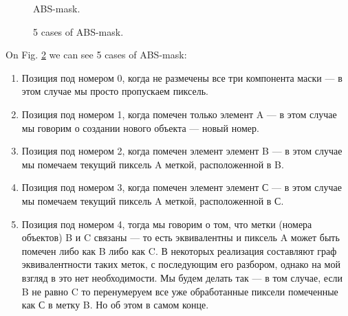 \documentclass[12pt,a4paper,oneside,titlepage]{article}
\begin{document}
\begin{figure}[h]
  \caption{ABS-mask.}
  \label{fig:abc_mask}
\end{figure}



\begin{figure}[h]
  \caption{5 cases of ABS-mask.}
  \label{fig:abc_all_cases}
\end{figure}


On Fig. \ref{fig:abc_all_cases} we can see 5 cases of ABS-mask:

\begin{enumerate}
	\item Позиция под номером 0, когда не размечены все три компонента маски — в этом случае мы просто пропускаем пиксель.
	\item Позиция под номером 1, когда помечен только элемент A — в этом случае мы говорим о создании нового объекта — новый номер.
	\item Позиция под номером 2, когда помечен элемент элемент B — в этом случае мы помечаем текущий пиксель A меткой, расположенной в B.
	\item Позиция под номером 3, когда помечен элемент элемент С — в этом случае мы помечаем текущий пиксель A меткой, расположенной в С.
	\item Позиция под номером 4, тогда мы говорим о том, что метки (номера объектов) B и C связаны — то есть эквивалентны и пиксель A может быть помечен либо как B либо как C. В некоторых реализация составляют граф эквивалентности таких меток, с последующим его разбором, однако на мой взгляд в это нет необходимости. Мы будем делать так — в том случае, если B не равно C то перенумеруем все уже обработанные пиксели помеченные как С в метку B. Но об этом в самом конце.
\end{enumerate}
\end{document}
